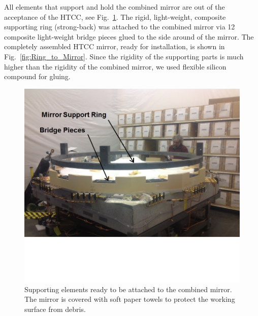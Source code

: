 All elements that support and hold the combined mirror are out of the acceptance of the HTCC, see
Fig.~\ref{fig:Support_Ring}. The rigid, light-weight, composite supporting ring (strong-back) was attached to the
combined mirror via 12 composite light-weight bridge pieces glued to the side around of the mirror. The completely
assembled HTCC mirror, ready for installation, is shown in Fig.~\ref{fig:Ring_to_Mirror}. Since the rigidity of the
supporting parts is much higher than the rigidity of the combined mirror, we used flexible silicon compound for
gluing.
  
\begin{figure}[ht]
    \centering
    \includegraphics[width=1.0\linewidth,trim={0 5cm 0 0},clip]{images/Support_Ring.jpg}
    \caption{Supporting elements ready to be attached to the combined mirror. The mirror is covered with soft paper
      towels to protect the working surface from debris.}
    \label{fig:Support_Ring}
\end{figure}


